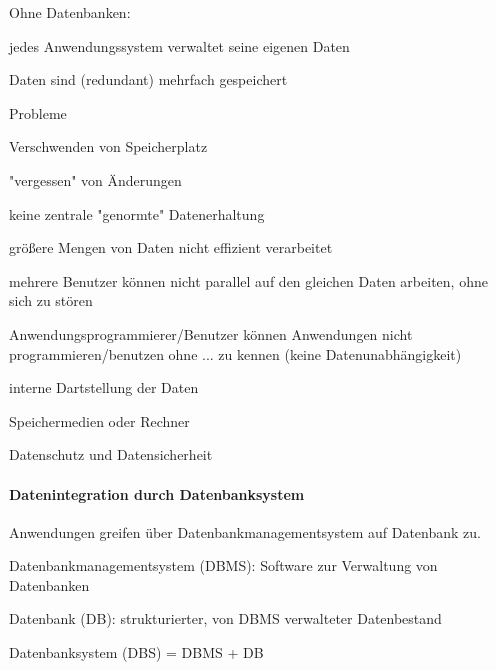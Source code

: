 \documentclass[a4paper]{article}
\begin{document}
\begin{multicols}{3}
Ohne Datenbanken:
\begin{itemize*}
    \item jedes Anwendungssystem verwaltet seine eigenen Daten
    \item Daten sind (redundant) mehrfach gespeichert
    \item Probleme
    \begin{itemize*}
        \item Verschwenden von Speicherplatz
        \item "vergessen" von Änderungen
        \item keine zentrale "genormte" Datenerhaltung
    \end{itemize*}
    \item größere Mengen von Daten nicht effizient verarbeitet
    \item mehrere Benutzer können nicht parallel auf den gleichen Daten arbeiten, ohne sich zu stören
    \item Anwendungsprogrammierer/Benutzer können Anwendungen nicht programmieren/benutzen ohne ... zu kennen (keine Datenunabhängigkeit)
    \begin{itemize*}
        \item interne Dartstellung der Daten
        \item Speichermedien oder Rechner
    \end{itemize*}
    \item Datenschutz und   Datensicherheit
\end{itemize*}

\paragraph{Datenintegration durch Datenbanksystem}
Anwendungen greifen über Datenbankmanagementsystem auf Datenbank zu.

Datenbankmanagementsystem (DBMS): Software zur Verwaltung von Datenbanken

Datenbank (DB): strukturierter, von DBMS verwalteter Datenbestand

Datenbanksystem (DBS) = DBMS + DB


\end{multicols}
\end{document}
